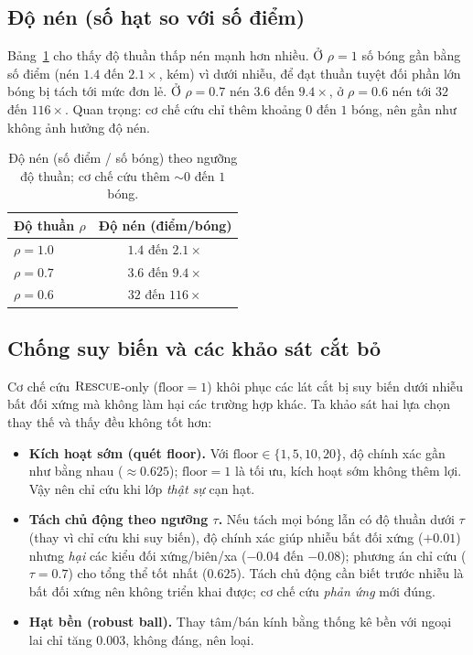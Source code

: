\documentclass[11pt,a4paper]{article}
\newcommand{\R}{\textsc{Rescue}}
\begin{document}
\subsection{Độ nén (số hạt so với số điểm)}
Bảng~\ref{tab:comp} cho thấy độ thuần thấp nén mạnh hơn nhiều. Ở $\rho=1$ số bóng gần bằng số điểm (nén $1.4$ đến $2.1\times$, kém) vì dưới nhiễu, để đạt thuần tuyệt đối phần lớn bóng bị tách tới mức đơn lẻ. Ở $\rho=0.7$ nén $3.6$ đến $9.4\times$, ở $\rho=0.6$ nén tới $32$ đến $116\times$. Quan trọng: cơ chế cứu chỉ thêm khoảng $0$ đến $1$ bóng, nên gần như không ảnh hưởng độ nén.

\begin{table}[h]
\centering
\caption{Độ nén (số điểm / số bóng) theo ngưỡng độ thuần; cơ chế cứu thêm $\sim 0$ đến $1$ bóng.}
\label{tab:comp}
\begin{tabular}{lc}
\toprule
Độ thuần $\rho$ & Độ nén (điểm/bóng) \\
\midrule
$\rho=1.0$ & $1.4$ đến $2.1\times$ \\
$\rho=0.7$ & $3.6$ đến $9.4\times$ \\
$\rho=0.6$ & $32$ đến $116\times$ \\
\bottomrule
\end{tabular}
\end{table}

\subsection{Chống suy biến và các khảo sát cắt bỏ}
\label{sec:ablation}
Cơ chế cứu $\R$-only ($\text{floor}=1$) khôi phục các lát cắt bị suy biến dưới nhiễu bất đối xứng mà không làm hại các trường hợp khác. Ta khảo sát hai lựa chọn thay thế và thấy đều không tốt hơn:
\begin{itemize}
\item \textbf{Kích hoạt sớm (quét floor).} Với $\text{floor}\in\{1,5,10,20\}$, độ chính xác gần như bằng nhau ($\approx 0.625$); $\text{floor}=1$ là tối ưu, kích hoạt sớm không thêm lợi. Vậy nên chỉ cứu khi lớp \emph{thật sự} cạn hạt.
\item \textbf{Tách chủ động theo ngưỡng $\tau$.} Nếu tách mọi bóng lẫn có độ thuần dưới $\tau$ (thay vì chỉ cứu khi suy biến), độ chính xác giúp nhiễu bất đối xứng ($+0.01$) nhưng \emph{hại} các kiểu đối xứng/biên/xa ($-0.04$ đến $-0.08$); phương án chỉ cứu ($\tau=0.7$) cho tổng thể tốt nhất ($0.625$). Tách chủ động cần biết trước nhiễu là bất đối xứng nên không triển khai được; cơ chế cứu \emph{phản ứng} mới đúng.
\item \textbf{Hạt bền (robust ball).} Thay tâm/bán kính bằng thống kê bền với ngoại lai chỉ tăng $0.003$, không đáng, nên loại.
\end{itemize}
\end{document}
